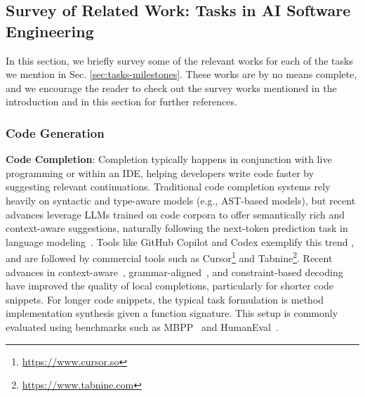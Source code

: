 \subsection{Survey of Related Work: Tasks in AI Software Engineering} \label{appendix:tasks}

In this section, we briefly survey some of the relevant works for each of the tasks we mention in Sec. \ref{sec:tasks-milestones}. These works are by no means complete, and we encourage the reader to check out the survey works mentioned in the introduction and in this section for further references.

\subsubsection{Code Generation}

\textbf{Code Completion}:
Completion typically happens in conjunction with live programming or within an IDE, helping developers write code faster by suggesting relevant continuations. 
Traditional code completion systems rely heavily on syntactic and type-aware models (e.g., AST-based models), but recent advances leverage LLMs trained on code corpora to offer semantically rich and context-aware suggestions, naturally following the next-token prediction task in language modeling~\citep{Radford2019LanguageMA}.
Tools like GitHub Copilot and Codex exemplify this trend \citep{chen2021evaluating}, and are followed by commercial tools such as Cursor\footnote{\url{https://www.cursor.so}} and Tabnine\footnote{\url{https://www.tabnine.com}}.
Recent advances in context-aware~\citep{agrawal2023guidinglanguagemodelscode}, grammar-aligned~\citep{park2024grammaraligneddecoding}, and constraint-based decoding~\citep{sun2023evaluatinglargelanguagemodels} have improved the quality of local completions, particularly for shorter code snippets.
For longer code snippets, the typical task formulation is method implementation synthesis given a function signature.
This setup is commonly evaluated using benchmarks such as MBPP~\citep{austin2021program} and HumanEval~\citep{chen2021evaluating}.

